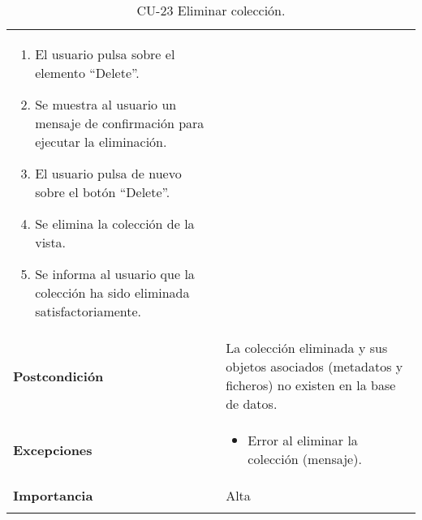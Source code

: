 \begin{longtable}[]{@{}ll@{}}
\begin{minipage}[t]{0.75\columnwidth}
\begin{enumerate}
\def\labelenumi{\arabic{enumi}.}
\tightlist
\item
  El usuario pulsa sobre el elemento ``Delete''.
\item
  Se muestra al usuario un mensaje de confirmación para ejecutar la
  eliminación.
\item
  El usuario pulsa de nuevo sobre el botón ``Delete''.
\item
  Se elimina la colección de la vista.
\item
  Se informa al usuario que la colección ha sido eliminada
  satisfactoriamente.
\end{enumerate}\strut
\end{minipage}\tabularnewline
\begin{minipage}[t]{0.19\columnwidth}\raggedright
\textbf{Postcondición}\strut
\end{minipage} & \begin{minipage}[t]{0.75\columnwidth}\raggedright
La colección eliminada y sus objetos asociados (metadatos y ficheros) no
existen en la base de datos.\strut
\end{minipage}\tabularnewline
\begin{minipage}[t]{0.19\columnwidth}\raggedright
\textbf{Excepciones}\strut
\end{minipage} & \begin{minipage}[t]{0.75\columnwidth}\raggedright
\begin{itemize}
\tightlist
\item
  Error al eliminar la colección (mensaje).
\end{itemize}\strut
\end{minipage}\tabularnewline
\begin{minipage}[t]{0.19\columnwidth}\raggedright
\textbf{Importancia}\strut
\end{minipage} & \begin{minipage}[t]{0.75\columnwidth}\raggedright
Alta\strut
\end{minipage}\tabularnewline
\bottomrule
\caption{CU-23 Eliminar colección.}
\end{longtable}

